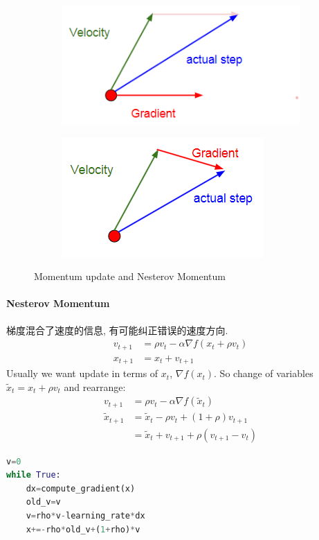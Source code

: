 \begin{figure}[!htb]
    \centering
    \begin{subfigure}{0.22\textwidth}
        \centering
        \includegraphics[width=\textwidth]{pic/Lec7/Momentum update}
    \end{subfigure}
    \begin{subfigure}{0.22\textwidth}
        \centering
        \includegraphics[width=\textwidth]{pic/Lec7/Nesterov Momentum}
    \end{subfigure}
    \caption{Momentum update and Nesterov Momentum}
\end{figure}


\paragraph{Nesterov Momentum} 梯度混合了速度的信息, 有可能纠正错误的速度方向. 
\begin{align*}
    v_{t+1}&=\rho v_t - \alpha \nabla f(x_t+\rho v_t)\\
    x_{t+1}&=x_t+v_{t+1}
\end{align*}
Usually we want update in terms of $x_t$, $\nabla f(x_t)$. So change of variables $\tilde{x}_t=x_t+\rho v_t$ and rearrange:
\begin{align*}
    v_{t+1}&=\rho v_t -\alpha \nabla f(\tilde{x}_t)\\
    \tilde{x}_{t+1}&=\tilde{x}_t-\rho v_t + (1+\rho )v_{t+1}\\
    &=\tilde{x}_t +v_{t+1}+\rho (v_{t+1}-v_t)
\end{align*}
\begin{lstlisting}[language={python}]
v=0
while True:
    dx=compute_gradient(x)
    old_v=v
    v=rho*v-learning_rate*dx
    x+=-rho*old_v+(1+rho)*v
\end{lstlisting}

